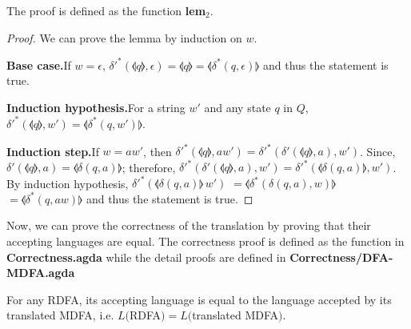 \par The proof is defined as the function \textbf{lem\(_2\)}. 

\begin{proof}
\noindent We can prove the lemma by induction on \(w\). 

\par \noindent \textbf{Base case.}\quad If \(w = \epsilon\),
\(\delta'^*(\llangle q \rrangle,\epsilon) = \llangle q \rrangle =
\llangle \delta^*(q,\epsilon) \rrangle\) and thus the statement is
true. 

\par \noindent \textbf{Induction hypothesis.}\quad For a string \(w'\) and
any state \(q\) in \(Q\), \(\delta'^*(\llangle q \rrangle,w') = \llangle \delta^*(q,w') \rrangle\). 

\par \noindent \textbf{Induction step.}\quad If \(w = aw'\), then
\(\delta'^*(\llangle q \rrangle,aw') = \delta'^*(\delta'(\llangle q
\rrangle,a),w')\). Since, \(\delta'(\llangle q \rrangle,a) = \llangle
\delta(q,a) \rrangle\); therefore, \(\delta'^*(\delta'(\llangle q
\rrangle,a),w') = \delta'^*(\llangle
\delta(q,a) \rrangle,w')\). By induction hypothesis,
\(\delta'^*(\llangle \delta(q,a) \rrangle\,w')\) \(= \llangle
\delta^*(\delta(q,a),w) \rrangle\) \(= \llangle
\delta^*(q,aw) \rrangle\) and thus the statement is true. 
\end{proof}

\par Now, we can prove the correctness of the translation by proving
that their accepting languages are equal. The correctness proof is
defined as the function  in
\textbf{Correctness.agda} while the detail proofs are defined in \textbf{Correctness/DFA-MDFA.agda}

\begin{thm}
\noindent For any RDFA, its accepting language is equal to
the language accepted by its translated MDFA, i.e. \(L(\)RDFA\()
= L(\)translated MDFA\()\). 
\end{thm}

